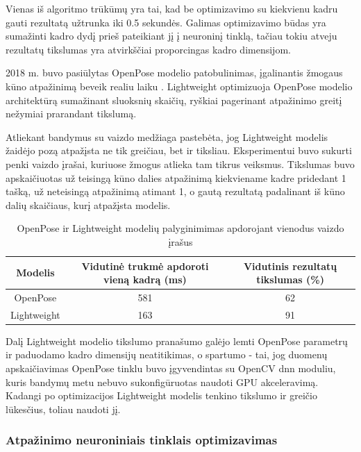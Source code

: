 \documentclass{VUMIFPSbakalaurinis}
\begin{document}
Vienas iš algoritmo trūkūmų yra tai, kad be optimizavimo su kiekvienu kadru gauti rezultatą užtrunka iki 0.5 sekundės. Galimas optimizavimo būdas yra sumažinti kadro dydį prieš pateikiant jį į neuroninį tinklą, tačiau tokiu atveju rezultatų tikslumas yra atvirkščiai proporcingas kadro dimensijom. 

2018 m. buvo pasiūlytas OpenPose modelio patobulinimas, įgalinantis žmogaus kūno atpažinimą beveik realiu laiku \cite{osokin2018realtime}. Lightweight optimizuoja OpenPose modelio architektūrą sumažinant sluoksnių skaičių, ryškiai pagerinant atpažinimo greitį nežymiai prarandant tikslumą. 

Atliekant bandymus su vaizdo medžiaga pastebėta, jog Lightweight modelis žaidėjo pozą atpažįsta ne tik greičiau, bet ir tiksliau. Eksperimentui buvo sukurti penki vaizdo įrašai, kuriuose žmogus atlieka tam tikrus veiksmus. Tikslumas buvo apskaičiuotas už teisingą kūno dalies atpažinimą kiekviename kadre pridedant 1 tašką, už neteisingą atpažinimą atimant 1, o gautą rezultatą padalinant iš kūno dalių skaičiaus, kurį atpažįsta modelis.

\begin{table}[H]\footnotesize
	\centering
	\caption{OpenPose ir Lightweight modelių palyginimimas apdorojant vienodus vaizdo įrašus}
	{\begin{tabular}{|c|c|c|} \hline
			\textbf{Modelis} & \textbf{Vidutinė trukmė apdoroti vieną kadrą (ms)} & \textbf{Vidutinis rezultatų tikslumas (\%)} \\
			\hline
			OpenPose  & 581    & 62       \\
			\hline
			Lightweight  & 163    & 91       \\
			\hline
	\end{tabular}}
	\label{tab:openposevslightweight}
\end{table}

Dalį Lightweight modelio tikslumo pranašumo galėjo lemti OpenPose parametrų ir paduodamo kadro dimensijų neatitikimas, o spartumo - tai, jog duomenų apskaičiavimas OpenPose tinklu buvo įgyvendintas su OpenCV dnn moduliu, kuris bandymų metu nebuvo sukonfigūruotas naudoti GPU akceleravimą. Kadangi po optimizacijos Lightweight modelis tenkino tikslumo ir greičio lūkesčius, toliau naudoti jį. 

\subsubsection{Atpažinimo neuroniniais tinklais optimizavimas}
\end{document}
